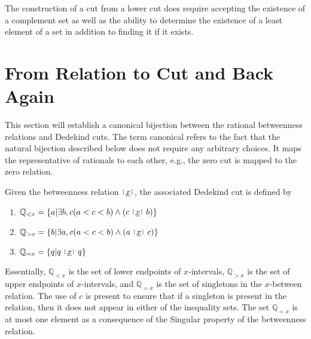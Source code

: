 \documentclass[12pt]{article}
\newcommand{\qcut}[2][x]{\ensuremath{\mathbb{Q}_{#2 #1}}}
\newcommand{\qlt}[1][x]{\qcut[#1]{<}}
\newcommand{\qeq}[1][x]{\qcut[#1]{=}}
\newcommand{\qgt}[1][x]{\qcut[#1]{>}}
\begin{document}
The construction of a cut from a lower cut does require accepting the existence of a complement set as well as the ability to determine the existence of a least element of a set in addition to finding it if it exists. 

\section{From Relation to Cut and Back Again}

This section will establish a canonical bijection between the rational betweenness relations and Dedekind cuts. The term canonical refers to the fact that the natural bijection described below does not require any arbitrary choices. It maps the representative of rationals to each other, e.g., the zero cut is mapped to the zero relation. 

Given the betweenness relation $\xrel$, the associated Dedekind cut is defined by \begin{enumerate}
    \item $\qlt = \{ a | \exists b, c (a < c < b) \wedge (c \xrel b) \} $
    \item $\qgt = \{ b | \exists a, c (a < c < b) \wedge (a \xrel c) \} $
    \item $\qeq = \{ q | q \xrel q \} $
\end{enumerate}
Essentially, $\qlt$ is the set of lower endpoints of $x$-intervals, $\mathbb{Q}_{>x}$ is the set of upper endpoints of $x$-intervals, and $\qeq$ is the set of singletons in the $x$-between relation. The use of $c$ is present to ensure that if a singleton is present in the relation, then it does not appear in either of the inequality sets. The set $\qeq$ is at most one element as a consequence of the Singular property of the betweenness relation.
\end{document}
